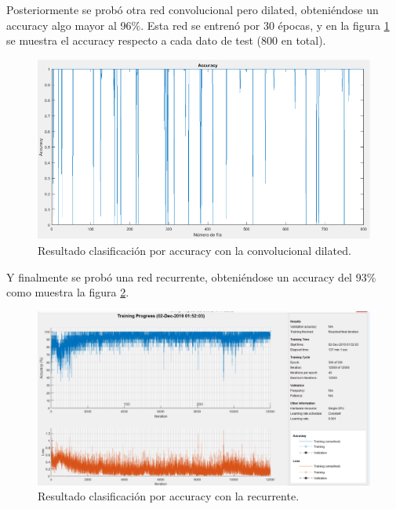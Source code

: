 \documentclass[a4paper,twocolumn]{article}
\begin{document}
Posteriormente se probó otra red convolucional pero dilated, obteniéndose un accuracy algo mayor al 96\%. Esta red se entrenó por 30 épocas, y en la figura \ref{clasifDilated} se muestra el accuracy respecto a cada dato de test (800 en total).
\begin{figure}[h]
	\includegraphics[trim={0cm 0cm 0cm 0cm}, clip,width=.5\textwidth]{./convDilated.png}
	\caption{Resultado clasificación por accuracy con la convolucional dilated.}
	\label{clasifDilated}
\end{figure}

Y finalmente se probó una red recurrente, obteniéndose un accuracy del 93\% como muestra la figura \ref{clasifRecurrent}.
\begin{figure}[h]
	\includegraphics[trim={0cm 0cm 0cm 0cm}, clip,width=.5\textwidth]{./recurrent.png}
	\caption{Resultado clasificación por accuracy con la recurrente.}
	\label{clasifRecurrent}
\end{figure}
\end{document}
